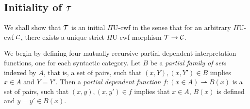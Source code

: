 \documentclass{lmcs}
\def\UU{\mathrm{U}}
\begin{document}
\subsection{Initiality of ${\mathcal T}$}
\label{sec:freenessT}

We shall show that ${\mathcal T}$ is an initial $\Pi\UU$-cwf in the sense that for an arbitrary $\Pi\UU$-cwf ${\mathcal C}$, there exists a unique strict $\Pi\UU$-cwf morphism ${\mathcal T}  \rightarrow  {\mathcal C}$. 

We begin by defining four mutually recursive partial dependent interpretation functions, one for each syntactic category. Let $B$ be a {\em partial family of sets} indexed by $A$, that is, a set of pairs, such that $(x,Y), (x,Y') \in B$ implies $x \in A$ and $Y=Y'$. Then a {\em partial dependent function} $f :  (x \in A) \rightharpoonup B(x)$  is a set of pairs, such that $(x,y), (x,y') \in f$ implies that $x \in A$, $B(x)$ is defined and $y = y' \in B(x)$.
\end{document}
